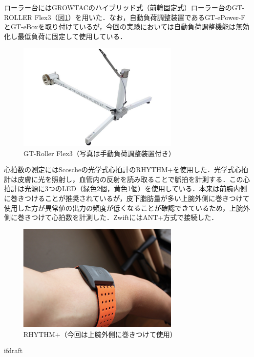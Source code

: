 ローラー台にはGROWTACのハイブリッド式（前輪固定式）ローラー台のGT-ROLLER Flex3（図\ref{fig:gt-roller_flex3}）を用いた．なお，自動負荷調整装置であるGT-ePower-FとGT-eBoxを取り付けているが，今回の実験においては自動負荷調整機能は無効化し最低負荷に固定して使用している．

\begin{figure}[H]
  \begin{center}
    \includegraphics[width=8cm]{fig/gt-roller_flex3}
    \caption{GT-Roller Flex3（写真は手動負荷調整装置付き）}
    \label{fig:gt-roller_flex3}
  \end{center}
\end{figure}

心拍数の測定にはScoscheの光学式心拍計のRHYTHM+を使用した．光学式心拍計は皮膚に光を照射し，血管内の反射を読み取ることで脈拍を計測する．この心拍計は光源に3つのLED（緑色2個，黄色1個）を使用している．本来は前腕内側に巻きつけることが推奨されているが，皮下脂肪量が多い上腕外側に巻きつけて使用した方が異常値の出力の頻度が低くなることが確認できているため，上腕外側に巻きつけて心拍数を計測した．ZwiftにはANT+方式で接続した．

\begin{figure}[H]
  \begin{center}
    \includegraphics[width=8cm]{fig/rhythm}
    \caption{RHYTHM+（今回は上腕外側に巻きつけて使用）}
    \label{fig:rhythm}
  \end{center}
\end{figure}

\expandafter\ifx\csname ifdraft\endcsname\relax
  
\fi
